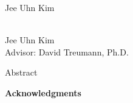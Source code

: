 \maketitle

\newpage

\thispagestyle{empty}
\begin{center}
\null
\vfill
{} Jee Uhn Kim
\end{center}

\newpage

\thispagestyle{empty}
\begin{center}
{\bf \thesistitle}\\
Jee Uhn Kim\\
Advisor: David Treumann, Ph.D.
\end{center}

Abstract

\frontmatter %

\thispagestyle{plain}
{}
\cfoot{\thepage}
\tableofcontents

\newpage

\thispagestyle{plain}
{}
\cfoot{\thepage}
\listoffigures

\newpage

\thispagestyle{plain}
{}
\cfoot{\thepage}
\vspace*{0.75in}
{\Large\textbf{Acknowledgments}}
\
\
\noindent
\bigskip


